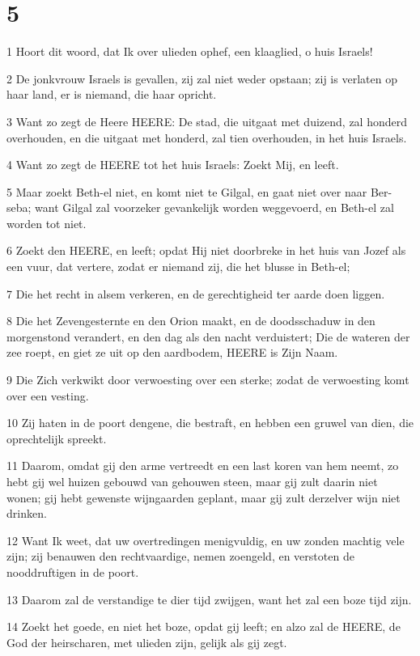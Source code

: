 \chapter{5}

\par 1 Hoort dit woord, dat Ik over ulieden ophef, een klaaglied, o huis Israels!
\par 2 De jonkvrouw Israels is gevallen, zij zal niet weder opstaan; zij is verlaten op haar land, er is niemand, die haar opricht.
\par 3 Want zo zegt de Heere HEERE: De stad, die uitgaat met duizend, zal honderd overhouden, en die uitgaat met honderd, zal tien overhouden, in het huis Israels.
\par 4 Want zo zegt de HEERE tot het huis Israels: Zoekt Mij, en leeft.
\par 5 Maar zoekt Beth-el niet, en komt niet te Gilgal, en gaat niet over naar Ber-seba; want Gilgal zal voorzeker gevankelijk worden weggevoerd, en Beth-el zal worden tot niet.
\par 6 Zoekt den HEERE, en leeft; opdat Hij niet doorbreke in het huis van Jozef als een vuur, dat vertere, zodat er niemand zij, die het blusse in Beth-el;
\par 7 Die het recht in alsem verkeren, en de gerechtigheid ter aarde doen liggen.
\par 8 Die het Zevengesternte en den Orion maakt, en de doodsschaduw in den morgenstond verandert, en den dag als den nacht verduistert; Die de wateren der zee roept, en giet ze uit op den aardbodem, HEERE is Zijn Naam.
\par 9 Die Zich verkwikt door verwoesting over een sterke; zodat de verwoesting komt over een vesting.
\par 10 Zij haten in de poort dengene, die bestraft, en hebben een gruwel van dien, die oprechtelijk spreekt.
\par 11 Daarom, omdat gij den arme vertreedt en een last koren van hem neemt, zo hebt gij wel huizen gebouwd van gehouwen steen, maar gij zult daarin niet wonen; gij hebt gewenste wijngaarden geplant, maar gij zult derzelver wijn niet drinken.
\par 12 Want Ik weet, dat uw overtredingen menigvuldig, en uw zonden machtig vele zijn; zij benauwen den rechtvaardige, nemen zoengeld, en verstoten de nooddruftigen in de poort.
\par 13 Daarom zal de verstandige te dier tijd zwijgen, want het zal een boze tijd zijn.
\par 14 Zoekt het goede, en niet het boze, opdat gij leeft; en alzo zal de HEERE, de God der heirscharen, met ulieden zijn, gelijk als gij zegt.
